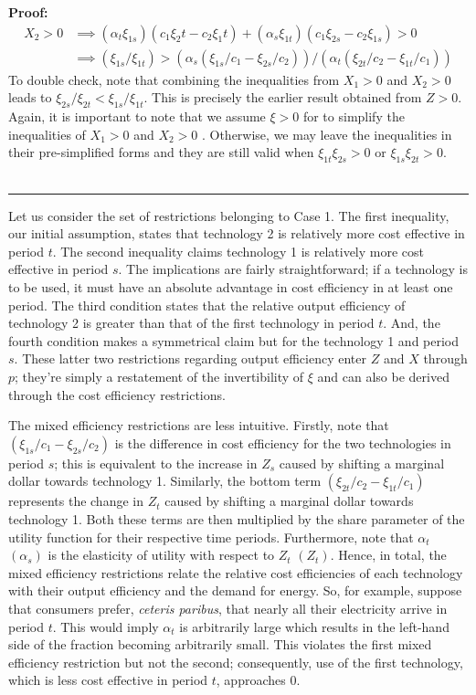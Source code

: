 \documentclass[11pt,a4paper]{extarticle}
\newenvironment{proof}[1][Proof]{\noindent\textbf{#1:} }{\ \rule{0.5em}{0.5em}}
\begin{document}
\begin{proof}
	\begin{align*}
	X_2 > 0 &\implies (\alpha_t \xi_{1s})(c_1 \xi_2t - c_2\xi_1t) + (\alpha_s \xi_{1t})(c_1 \xi_{2s} - c_2 \xi_{1s}) > 0\\
	&\implies (\xi_{1s}/\xi_{1t}) > (\alpha_s (\xi_{1s}/c_1 -  \xi_{2s}/c_2))/(\alpha_t(\xi_{2t}/c_2 - \xi_{1t}/c_1)) 
	\end{align*}
	To double check, note that combining the inequalities from $X_1>0$ and $X_2 > 0$ leads to $\xi_{2s}/\xi_{2t} < \xi_{1s}/\xi_{1t}$. This is precisely the earlier result obtained from $Z > 0$. Again, it is  important to note that we assume $\xi > 0$ for to simplify the inequalities of $X_1 > 0$ and $X_2 > 0$ . Otherwise, we may leave the inequalities in their pre-simplified forms and they are still valid when  $\xi_{1t} \xi_{2s} > 0$ or $\xi_{1s} \xi_{2t} > 0$.   \\ \hfill
\end{proof}

Let us consider the set of restrictions belonging to Case 1. The first inequality, our initial assumption, states that technology 2 is relatively more cost effective in period $t$. The second inequality claims technology 1 is relatively more cost effective in period $s$. The implications are fairly straightforward; if a technology is to be used, it must have an absolute advantage in cost efficiency in at least one period. The third condition states that the relative output efficiency of technology 2 is greater than that of the first technology in period $t$. And, the fourth condition makes a symmetrical claim but for the technology 1 and period $s$. These latter two restrictions regarding output efficiency enter $Z$ and $X$ through $p$; they're simply a restatement of the invertibility of $\xi$ and can also be derived through the cost efficiency restrictions. 

The mixed efficiency restrictions are less intuitive. Firstly, note that $\left(\xi_{1s}/c_1 - \xi_{2s}/c_2\right)$ is the difference in cost efficiency for the two technologies in period $s$; this is equivalent to the increase in $Z_s$ caused by shifting a marginal dollar towards technology 1. Similarly, the bottom term $\left( \xi_{2t}/c_2 - \xi_{1t}/c_1 \right)$ represents the change in $Z_t$ caused by shifting a marginal dollar towards technology 1. Both these terms are then multiplied by the share parameter of the utility function for their respective time periods. Furthermore, note that $\alpha_t$ $(\alpha_s)$ is the elasticity of utility with respect to $Z_t$ $(Z_t)$. Hence, in total, the mixed efficiency restrictions relate the relative cost efficiencies of each technology with their output efficiency and the demand for energy. So, for example, suppose that consumers prefer, \textit{ceteris paribus}, that nearly all their electricity arrive in period $t$. This would imply $\alpha_t$ is arbitrarily large which results in the left-hand side of the fraction becoming arbitrarily small. This violates the first mixed efficiency restriction but not the second; consequently, use of the first technology, which is less cost effective in period $t$, approaches $0$. 
\end{document}
